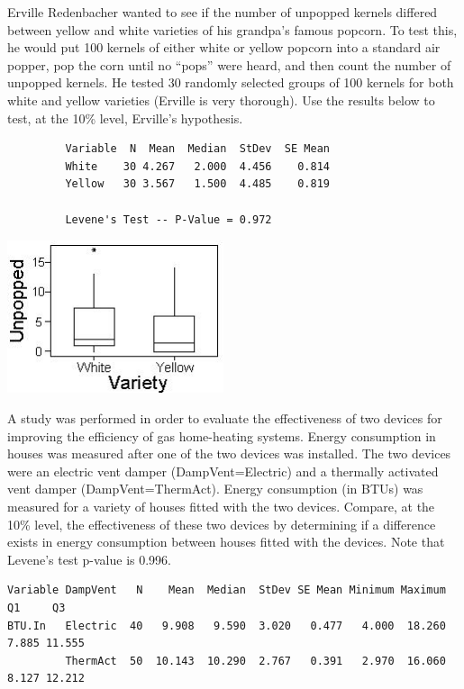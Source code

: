 \documentclass[10pt,openany]{book}\usepackage[]{graphicx}\usepackage[]{color}
\begin{document}
\newpage
\begin{exsection}
  \item \label{revex:tTestPopcorn} Erville Redenbacher wanted to see if the number of unpopped kernels differed between yellow and white varieties of his grandpa's famous popcorn.  To test this, he would put 100 kernels of either white or yellow popcorn into a standard air popper, pop the corn until no ``pops'' were heard, and then count the number of unpopped kernels.  He tested 30 randomly selected groups of 100 kernels for both white and yellow varieties (Erville is very thorough).  Use the results below to test, at the 10\% level, Erville's hypothesis. 

  \begin{Verbatim}
         Variable  N  Mean  Median  StDev  SE Mean
         White    30 4.267   2.000  4.456    0.814
         Yellow   30 3.567   1.500  4.485    0.819

         Levene's Test -- P-Value = 0.972
  \end{Verbatim}
\begin{center}
    \includegraphics[width=2.5in]{Figs/t2_pcorn.jpg}
\end{center}

  \item \label{revex:tTestHeatVent} A study was performed in order to evaluate the effectiveness of two devices for improving the efficiency of gas home-heating systems.  Energy consumption in houses was measured after one of the two devices was installed.  The two devices were an electric vent damper (DampVent=Electric) and a thermally activated vent damper (DampVent=ThermAct).  Energy consumption (in BTUs) was measured for a variety of houses fitted with the two devices.  Compare, at the 10\% level, the effectiveness of these two devices by determining if a difference exists in energy consumption between houses fitted with the devices.  Note that Levene's test p-value is 0.996. 
  \begin{Verbatim}
Variable DampVent   N    Mean  Median  StDev SE Mean Minimum Maximum     Q1     Q3
BTU.In   Electric  40   9.908   9.590  3.020   0.477   4.000  18.260  7.885 11.555
         ThermAct  50  10.143  10.290  2.767   0.391   2.970  16.060  8.127 12.212
  \end{Verbatim}


\end{exsection}
\end{document}
